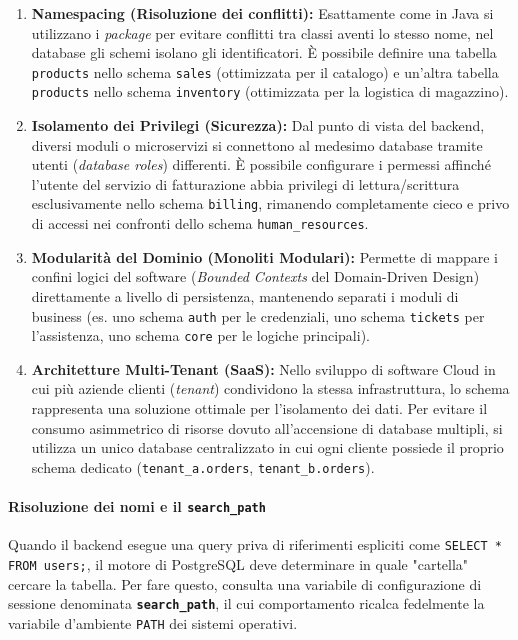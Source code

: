 \begin{enumerate}
    \item \textbf{Namespacing (Risoluzione dei conflitti):} Esattamente come in Java si utilizzano i \textit{package} per evitare conflitti tra classi aventi lo stesso nome, nel database gli schemi isolano gli identificatori. È possibile definire una tabella \texttt{products} nello schema \texttt{sales} (ottimizzata per il catalogo) e un'altra tabella \texttt{products} nello schema \texttt{inventory} (ottimizzata per la logistica di magazzino).
    \item \textbf{Isolamento dei Privilegi (Sicurezza):} Dal punto di vista del backend, diversi moduli o microservizi si connettono al medesimo database tramite utenti (\textit{database roles}) differenti. È possibile configurare i permessi affinché l'utente del servizio di fatturazione abbia privilegi di lettura/scrittura esclusivamente nello schema \texttt{billing}, rimanendo completamente cieco e privo di accessi nei confronti dello schema \texttt{human\_resources}.
    \item \textbf{Modularità del Dominio (Monoliti Modulari):} Permette di mappare i confini logici del software (\textit{Bounded Contexts} del Domain-Driven Design) direttamente a livello di persistenza, mantenendo separati i moduli di business (es. uno schema \texttt{auth} per le credenziali, uno schema \texttt{tickets} per l'assistenza, uno schema \texttt{core} per le logiche principali).
    \item \textbf{Architetture Multi-Tenant (SaaS):} Nello sviluppo di software Cloud in cui più aziende clienti (\textit{tenant}) condividono la stessa infrastruttura, lo schema rappresenta una soluzione ottimale per l'isolamento dei dati. Per evitare il consumo asimmetrico di risorse dovuto all'accensione di database multipli, si utilizza un unico database centralizzato in cui ogni cliente possiede il proprio schema dedicato (\texttt{tenant\_a.orders}, \texttt{tenant\_b.orders}).
\end{enumerate}

\paragraph{Risoluzione dei nomi e il \texttt{search\_path}}

Quando il backend esegue una query priva di riferimenti espliciti come \texttt{SELECT * FROM users;}, il motore di PostgreSQL deve determinare in quale "cartella" cercare la tabella. Per fare questo, consulta una variabile di configurazione di sessione denominata \textbf{\texttt{search\_path}}, il cui comportamento ricalca fedelmente la variabile d'ambiente \texttt{PATH} dei sistemi operativi.

